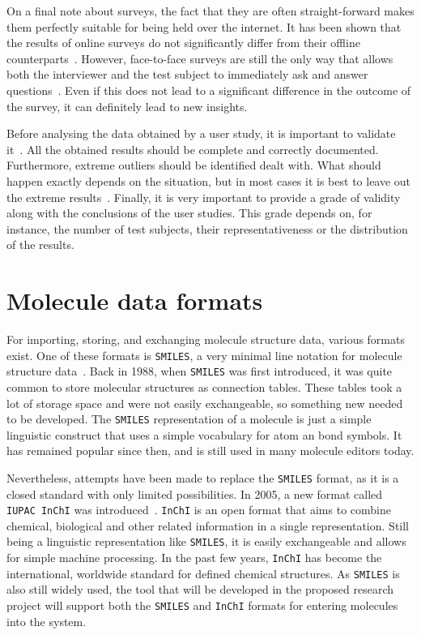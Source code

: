 On a final note about surveys, the fact that they are often straight-forward makes them perfectly suitable for being held over the internet. It has been shown that the results of online surveys do not significantly differ from their offline counterparts~\cite{komarov2013crowdsourcing}. However, face-to-face surveys are still the only way that allows both the interviewer and the test subject to immediately ask and answer questions~\cite{wohlin2003empirical}. Even if this does not lead to a significant difference in the outcome of the survey, it can definitely lead to new insights.

Before analysing the data obtained by a user study, it is important to validate it~\cite{wohlin2003empirical}. All the obtained results should be complete and correctly documented. Furthermore, extreme outliers should be identified dealt with. What should happen exactly depends on the situation, but in most cases it is best to leave out the extreme results~\cite{komarov2013crowdsourcing}. Finally, it is very important to provide a grade of validity along with the conclusions of the user studies. This grade depends on, for instance, the number of test subjects, their representativeness or the distribution of the results.


\section{Molecule data formats}

For importing, storing, and exchanging molecule structure data, various formats exist. One of these formats is \verb|SMILES|, a very minimal line notation for molecule structure data~\cite{daylight1992daylight}. Back in 1988, when \verb|SMILES| was first introduced, it was quite common to store molecular structures as connection tables. These tables took a lot of storage space and were not easily exchangeable, so something new needed to be developed. The \verb|SMILES| representation of a molecule is just a simple linguistic construct that uses a simple vocabulary for atom an bond symbols. It has remained popular since then, and is still used in many molecule editors today.

Nevertheless, attempts have been made to replace the \verb|SMILES| format, as it is a closed standard with only limited possibilities. In 2005, a new format called \verb|IUPAC InChI| was introduced~\cite{heller2013inchi}. \verb|InChI| is an open format that aims to combine chemical, biological and other related information in a single representation. Still being a linguistic representation like \verb|SMILES|, it is easily exchangeable and allows for simple machine processing. In the past few years, \verb|InChI| has become the international, worldwide standard for defined chemical structures. As \verb|SMILES| is also still widely used, the tool that will be developed in the proposed research project will support both the \verb|SMILES| and \verb|InChI| formats for entering molecules into the system.
